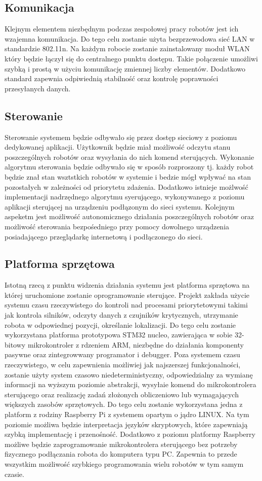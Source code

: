 \documentclass[a4paper, 12pt]{article}
\begin{document}
\subsection{Komunikacja}
Klejnym elementem niezbędnym podczas zespołowej pracy robotów jest ich wzajemna komunikacja. Do tego celu zostanie użyta bezprzewodowa sieć LAN w standardzie 802.11n. Na każdym robocie zostanie zainstalowany moduł WLAN który będzie łączył się do centralnego punktu dostępu. Takie połączenie umożliwi szybką i prostą w użyciu komunikację zmiennej liczby elementów. Dodatkowo standard zapewnia odpiwiednią stabilność oraz kontrolę poprawności przesyłanych danych. 

\subsection{Sterowanie}
Sterowanie systemem będzie odbywało się przez dostęp sieciowy z poziomu dedykowanej aplikacji. Użytkownik będzie miał możliwość odczytu stanu poszczególnych robotów oraz wysyłania do nich komend sterujących. Wykonanie algorytmu sterowania będzie odbywało się w sposób rozproszony tj. każdy robot będzie znał stan wsztstkich robotów w systemie i bedzie mógł wpływać na stan pozostałych w zależności od priorytetu zdażenia. Dodatkowo istnieje możlwość implementacji nadrzędnego algorytmu syerującego, wykonywanego z poziomu aplikacji sterującej na urządzeniu podłązonym do sieci systemu. Kolejnym aspeketm jest możliwość autonomicznego działania poszczególnych robotów oraz możliwość sterowania bezpośedniego przy pomocy dowolnego urządzenia posiadającego przeglądarkę internetową i podłączonego do sieci. 

\subsection{Platforma sprzętowa}
Istotną rzecą z punktu widzenia działania systemu jest platforma sprzętowa na której uruchomione zostanie oprogramowanie sterujące. Projekt zakłada użycie systemu czasu rzeczywistego do kontroli nad procesami priorytetowymi takimi jak kontrola silników, odczyty danych z czujników krytycznych, utrzymanie robota w odpowiednej pozycji, określanie lokalizacji. Do tego celu zostanie wykorzystana platforma prototypowa STM32 nucleo, zawierająca w sobie 32-bitowy mikrokontroler z rdzeniem ARM, niezbędne do działania komponenty pasywne oraz zintegrowwany programator i debugger. Poza systemem czasu rzeczywistego, w celu zapewnienia możliwiej jak najszerszej funkcjonalności, zostanie użyty system czasowo niedeterministyczny, odpowiedzialny za wymianę informacji na wyższym poziomie abstrakcji, wysyłaie komend do mikrokontrolera sterującego oraz realizację zadań złożonych obliczeniowo lub wymagających większych zasobów sprzętowych. Do tego celu zostanie wykorzystana jedna z platform z rodziny Raspberry Pi z systemem opartym o jądro LINUX. Na tym poziomie możliwa będzie interpretacja języków skryptowych, które zapewniają szybką implementację i przenośność. Dodatkowo z poziomu platformy Raspberry możliwe będzie zaprogramowanie mikrokontrolera sterującego bez potrzeby fizycznego podłączania robota do komputera typu PC. Zapewnia to przede wszystkim możliwość szybkiego programowania wielu robotów w tym samym czasie. 
\end{document}
